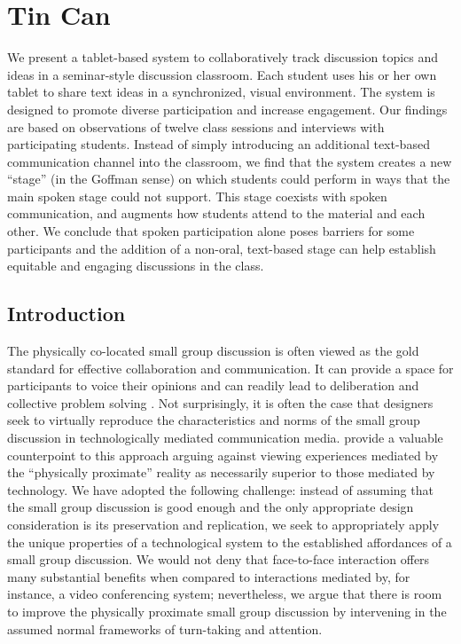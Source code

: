 \chapter{Tin Can}

We present a tablet-based system to collaboratively track discussion topics and ideas in a seminar-style discussion classroom. Each student uses his or her own tablet to share text ideas in a synchronized, visual environment. The system is designed to promote diverse participation and increase engagement. Our findings are based on observations of twelve class sessions and interviews with participating students. Instead of simply introducing an additional text-based communication channel into the classroom, we find that the system creates a new ``stage'' (in the Goffman sense) on which students could perform in ways that the main spoken stage could not support. This stage coexists with spoken communication, and augments how students attend to the material and each other. We conclude that spoken participation alone poses barriers for some participants and the addition of a non-oral, text-based stage can help establish equitable and engaging discussions in the class.



\section{Introduction}

The physically co-located small group discussion is often viewed as the gold standard for effective collaboration and communication.  It can provide a space for participants to voice their opinions and can readily lead to deliberation and collective problem solving \citep{Burkhalter:2002vg}. Not surprisingly, it is often the case that designers seek to virtually reproduce the characteristics and norms of the small group discussion in technologically mediated communication media. \citet{Hollan:1992tz} provide a valuable counterpoint to this approach arguing against viewing experiences mediated by the ``physically proximate'' reality as necessarily superior to those mediated by technology. We have adopted the following challenge: instead of assuming that the small group discussion is good enough and the only appropriate design consideration is its preservation and replication, we seek to appropriately apply the unique properties of a technological system to the established affordances of a small group discussion. We would not deny that face-to-face interaction offers many substantial benefits when compared to interactions mediated by, for instance, a video conferencing system; nevertheless, we argue that there is room to improve the physically proximate small group discussion by intervening in the assumed normal frameworks of turn-taking and attention.

